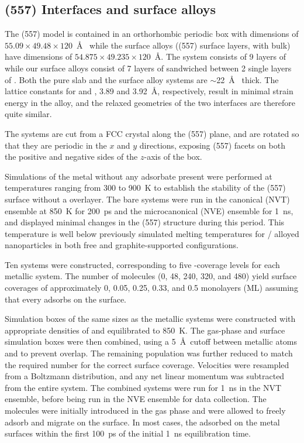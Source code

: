 \subsection{(557) Interfaces and surface alloys}
The (557) model is contained in an orthorhombic periodic box
with dimensions of $55.09 \times 49.48 \times 120$~\AA~ while the
surface alloys ((557) surface layers, with  bulk) have
dimensions of $54.875 \times 49.235 \times 120$~\AA.  The 
system consists of 9 layers of  while our surface alloys
consist of 7 layers of  sandwiched between 2 single layers of
.  Both the pure  slab and the surface alloy systems are
$\sim$22~\AA~ thick. The lattice constants for  and ,
3.89 and 3.92~\AA, respectively, result in minimal strain energy in
the alloy, and the relaxed geometries of the two interfaces are
therefore quite similar.

The systems are cut from a FCC crystal along the (557) plane, and are
rotated so that they are periodic in the $x$ and $y$ directions,
exposing (557) facets on both the positive and negative sides of the
$z$-axis of the box.

Simulations of the metal without any adsorbate present were performed
at temperatures ranging from 300 to 900~K to establish the stability
of the (557) surface without a  overlayer.  The bare systems
were run in the canonical (NVT) ensemble at 850~K for 200~ps and the
microcanonical (NVE) ensemble for 1~ns, and displayed minimal changes
in the (557) structure during this period.  This temperature is well
below previously simulated melting temperatures for /
alloyed nanoparticles in both free and graphite-supported
configurations.\citep{Sankaranarayanan:2005bh, Sankaranarayanan:2005qf, Fernandez:2013yg}

Ten systems were constructed, corresponding to five -coverage
levels for each metallic system.  The number of  molecules (0,
48, 240, 320, and 480) yield surface coverages of approximately 0,
0.05, 0.25, 0.33, and 0.5 monolayers (ML) assuming that every 
adsorbs on the surface.

Simulation boxes of the same sizes as the metallic systems were
constructed with appropriate densities of  and equilibrated to
850~K. The gas-phase  and surface simulation boxes were then
combined, using a 5~\AA\ cutoff between metallic atoms and  to
prevent overlap. The remaining  population was further reduced
to match the required number for the correct surface coverage.
Velocities were resampled from a Boltzmann distribution, and any net
linear momentum was subtracted from the entire system.  The combined
systems were run for 1~ns in the NVT ensemble, before being run in the
NVE ensemble for data collection.  The  molecules were
initially introduced in the gas phase and were allowed to freely
adsorb and migrate on the surface.  In most cases, the 
adsorbed on the metal surfaces within the first 100~ps of the initial
1~ns equilibration time.

